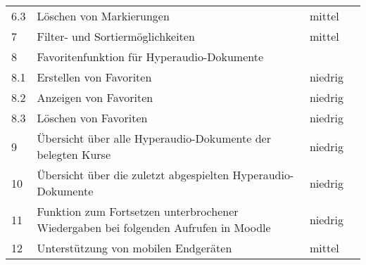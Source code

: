 \begin{table}[!ht]
\begin{tabularx}{\textwidth}{lXll}
   	6.3 & \hspace*{0.5cm} Löschen von Markierungen & mittel\\
   	7 & Filter- und Sortiermöglichkeiten & mittel\\
    8 & Favoritenfunktion für Hyperaudio-Dokumente & \\
    8.1 & \hspace*{0.5cm} Erstellen von Favoriten & niedrig\\
    8.2 & \hspace*{0.5cm} Anzeigen von Favoriten & niedrig\\
    8.3 & \hspace*{0.5cm} Löschen von Favoriten & niedrig\\    
    9 & Übersicht über alle Hyperaudio-Dokumente der belegten Kurse & niedrig\\
    10 & Übersicht über die zuletzt abgespielten Hyperaudio-Dokumente & niedrig\\
    11 &  Funktion zum Fortsetzen unterbrochener Wiedergaben bei folgenden Aufrufen in Moodle & niedrig\\
    12 & Unterstützung von mobilen Endgeräten & mittel\\
    \hline
\end{tabularx}
\end{table}




